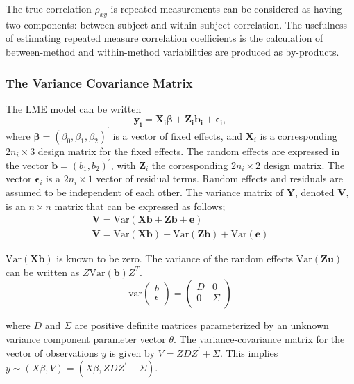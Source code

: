 \documentclass[12pt, a4paper]{report}
\theoremstyle{plain}
\theoremstyle{definition}
\theoremstyle{remark}
\begin{document}
	The true correlation $\rho_{xy}$ is repeated measurements can be considered as having two components: between subject and within-subject correlation. The usefulness of estimating repeated measure correlation coefficients is the calculation of between-method and within-method variabilities are produced as by-products.
	
\subsubsection{The Variance Covariance Matrix}
		The LME model can be written
		\[
		\boldsymbol{y_{i}} = \boldsymbol{X_{i}\beta} + \boldsymbol{Z_{i}b_{i}} + \boldsymbol{\epsilon_{i}},
		\]
		where $\boldsymbol{\beta}=(\beta_0,\beta_1,\beta_2)^\prime$ is a vector of fixed effects, and $\boldsymbol{X}_i$ is a corresponding $2n_i\times 3$ design matrix for the fixed effects. The random effects are expressed in the vector $\boldsymbol{b}=(b_1,b_2)^\prime$, with $\boldsymbol{Z}_i$ the corresponding $2n_i\times 2$ design matrix. The vector $\boldsymbol{\epsilon}_i$ is a $2n_i\times 1$ vector of residual terms. Random effects and residuals are assumed to be independent of each other.
	The variance matrix of \textbf{Y}, denoted \textbf{V}, is an $n \times n$ matrix that can be expressed
	as follows;
	\begin{eqnarray}
	\textbf{V}= \textrm{Var} ( \textbf{Xb} + \textbf{Zb} + \textbf{e})\\
	\textbf{V}= \textrm{Var} ( \textbf{Xb} ) + \textrm{Var} (\textbf{Zb}) +
	\textrm{Var}(\textbf{e})
	\end{eqnarray}
	
	
	$\mbox{Var}(\textbf{Xb})$ is known to be zero. The variance of the
	random effects $\mbox{Var}(\textbf{Zu})$ can be written as
	$Z\mbox{Var}(\textbf{b})Z^{T}$.
	\[
	\mathrm{var}
	\left(
	\begin{array}{c}
	b \\
	\epsilon \\
	\end{array}
	\right)
	=
	\left(
	\begin{array}{cc}
	D & 0 \\
	0 & \Sigma \\
	\end{array}
	\right)
	\]
	
	
	
	
	where $D$ and $\Sigma$ are positive definite matrices parameterized by an unknown variance component parameter vector $ \theta.$ The variance-covariance matrix for the vector of observations $y$ is given by $V = ZDZ^{\prime}+ \Sigma.$ This implies $y \sim(X\beta, V) = (X\beta,ZDZ^{\prime}+ \Sigma)$. 
			
\end{document}

